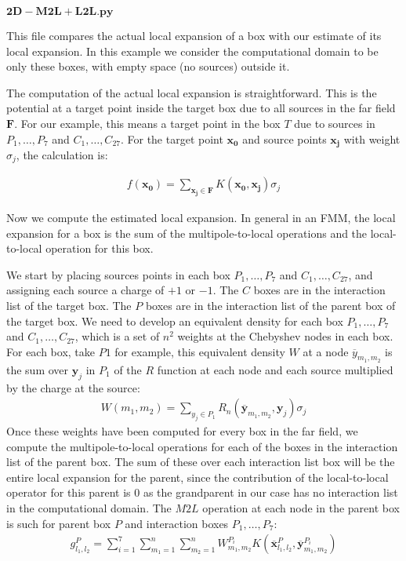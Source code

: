 \documentclass[11pt, oneside]{article}   	%
\begin{document}
\begin{appendices}
$\mathbf{2D-M2L+L2L.py}$

This file compares the actual local expansion of a box with our estimate of its local expansion. In this example we consider the computational domain to be only these boxes, with empty space (no sources) outside it.

The computation of the actual local expansion is straightforward. This is the potential at a target point inside the target box due to all sources in the far field $\mathbf{F}$. For our example, this means a target point in the box $T$ due to sources in $P_1,\dots,P_7$ and $C_1,\dots,C_{27}$. For the target point $\mathbf{x_0}$ and source points $\mathbf{x_j}$ with weight $\sigma_j$, the calculation is:

\begin{align}
f(\mathbf{x_0}) = \sum_{\mathbf{x_j}\in \mathbf{F}} K(\mathbf{x_0},\mathbf{x_j})\sigma_j
\end{align}

Now we compute the estimated local expansion. In general in an FMM, the local expansion for a box is the sum of the multipole-to-local operations and the local-to-local operation for this box.

We start by placing sources points in each box $P_1,\dots,P_7$ and $C_1,\dots,C_{27}$, and assigning each source a charge of $+1$ or $-1$. The $C$ boxes are in the interaction list of the target box. The $P$ boxes are in the interaction list of the parent box of the target box. We need to develop an equivalent density for each box $P_1,\dots,P_7$ and $C_1,\dots,C_{27}$, which is a set of $n^2$ weights at the Chebyshev nodes in each box. For each box, take $P1$ for example, this equivalent density $W$ at a node $\overline{y}_{m_1,m_2}$ is the sum over $\mathbf{y}_j$ in $P_1$ of the $R$ function at each node and each source multiplied by the charge at the source:
\begin{align}
W(m_1,m_2) = \sum_{y_j\in P_1} R_n(\mathbf{\overline{y}}_{m_1,m_2},\mathbf{y}_j)\sigma_j
\end{align}
Once these weights have been computed for every box in the far field, we compute the multipole-to-local operations for each of the boxes in the interaction list of the parent box. The sum of these over each interaction list box will be the entire local expansion for the parent, since the contribution of the local-to-local operator for this parent is $0$ as the grandparent in our case has no interaction list in the computational domain. The $M2L$ operation at each node in the parent box is such for parent box $P$ and interaction boxes $P_1,\dots,P_7$:
\begin{align}
g^P_{l_1,l_2} = \sum_{i=1}^7\sum_{m_1=1}^n\sum_{m_2=1}^n W_{m_1,m_2}^{P_i}K(\mathbf{\overline{x}}^P_{l_1,l_2},\mathbf{\overline{y}}^{P_i}_{m_1,m_2})
\end{align}


\end{appendices}
\end{document}

